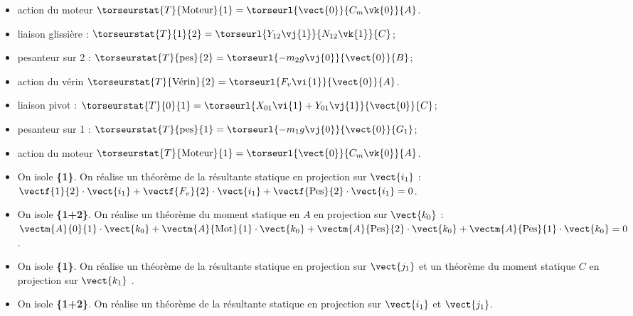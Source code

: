 \begin{corrigebox}
\begin{itemize}
\item action du moteur $\torseurstat{T}{\text{Moteur}}{1} =  \torseurl{\vect{0}}{C_m \vk{0}}{A}$.
\end{itemize}
\begin{itemize}
\item liaison glissière : $\torseurstat{T}{1}{2} = \torseurl{Y_{12}\vj{1}}{N_{12}\vk{1}}{C}$;
\item pesanteur sur 2 : $\torseurstat{T}{\text{pes}}{2} = \torseurl{-m_2 g \vj{0}}{\vect{0}}{B}$;
\item action du vérin $\torseurstat{T}{\text{Vérin}}{2} =  \torseurl{F_v \vi{1}}{\vect{0}}{A}$.
\item liaison pivot : $\torseurstat{T}{0}{1}= \torseurl{X_{01}\vi{1}+Y_{01}\vj{1}}{\vect{0}}{C}$;
\item pesanteur sur 1 : $\torseurstat{T}{\text{pes}}{1} = \torseurl{-m_1 g \vj{0}}{\vect{0}}{G_1}$;
\item action du moteur $\torseurstat{T}{\text{Moteur}}{1} =  \torseurl{\vect{0}}{C_m \vk{0}}{A}$.
\end{itemize}
\begin{itemize}
\item On isole \textbf{\{1\}}. On réalise un théorème de la résultante statique en projection sur $\vect{i_1}$ :
$ \vectf{1}{2}\cdot \vect{i_1} + \vectf{F_v}{2}\cdot \vect{i_1} + \vectf{\text{Pes}}{2}\cdot \vect{i_1} = 0$.
\item On isole \textbf{\{1+2\}}. On réalise un théorème du moment statique en $A$ en projection sur $\vect{k_0}$ :
$ \vectm{A}{0}{1}\cdot \vect{k_0} 
+ \vectm{A}{\text{Mot}}{1}\cdot \vect{k_0} 
+ \vectm{A}{\text{Pes}}{2}\cdot \vect{k_0}
+ \vectm{A}{\text{Pes}}{1}\cdot \vect{k_0} = 0$.
\end{itemize}
\begin{itemize}
\item On isole \textbf{\{1\}}. On réalise un théorème de la résultante statique en projection sur $\vect{j_1}$ 
et un théorème du moment statique $C$ en projection sur $\vect{k_1}$ .
\item On isole \textbf{\{1+2\}}. On réalise un théorème de la résultante statique en projection sur $\vect{i_1}$ et $\vect{j_1}$.
\end{itemize}
\end{corrigebox}
